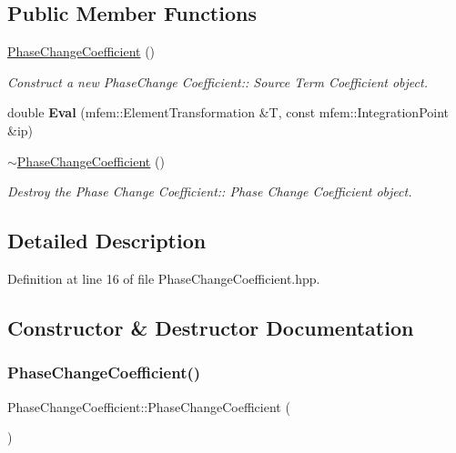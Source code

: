 \subsection*{Public Member Functions}
\begin{DoxyCompactItemize}
\item 
\hyperlink{classPhaseChangeCoefficient_aa2c0bf141fb3d05a68522642127f867b}{Phase\+Change\+Coefficient} ()
\begin{DoxyCompactList}\small\item\em Construct a new Phase\+Change Coefficient\+:\+: Source Term Coefficient object. \end{DoxyCompactList}\item 
\mbox{\label{classPhaseChangeCoefficient_a9c64da756fbff9bd786cfaf223eaba50}} 
double {\bfseries Eval} (mfem\+::\+Element\+Transformation \&T, const mfem\+::\+Integration\+Point \&ip)
\item 
\hyperlink{classPhaseChangeCoefficient_a3e28051637e778e8dc2b6d1a907b59ea}{$\sim$\+Phase\+Change\+Coefficient} ()
\begin{DoxyCompactList}\small\item\em Destroy the Phase Change Coefficient\+:\+: Phase Change Coefficient object. \end{DoxyCompactList}\end{DoxyCompactItemize}


\subsection{Detailed Description}


Definition at line 16 of file Phase\+Change\+Coefficient.\+hpp.



\subsection{Constructor \& Destructor Documentation}
\mbox{\label{classPhaseChangeCoefficient_aa2c0bf141fb3d05a68522642127f867b}} 
\subsubsection{\texorpdfstring{Phase\+Change\+Coefficient()}{PhaseChangeCoefficient()}}
{\footnotesize\ttfamily Phase\+Change\+Coefficient\+::\+Phase\+Change\+Coefficient (\begin{DoxyParamCaption}{ }\end{DoxyParamCaption})}



